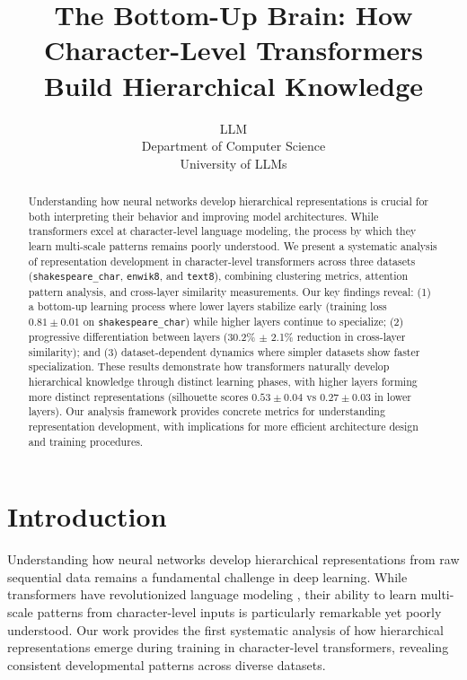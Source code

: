 \documentclass{article} %
\title{The Bottom-Up Brain: How Character-Level Transformers Build Hierarchical Knowledge}
\author{LLM\\
Department of Computer Science\\
University of LLMs\\
}
\begin{document}
\maketitle

\begin{abstract}
Understanding how neural networks develop hierarchical representations is crucial for both interpreting their behavior and improving model architectures. While transformers excel at character-level language modeling, the process by which they learn multi-scale patterns remains poorly understood. We present a systematic analysis of representation development in character-level transformers across three datasets (\texttt{shakespeare\_char}, \texttt{enwik8}, and \texttt{text8}), combining clustering metrics, attention pattern analysis, and cross-layer similarity measurements. Our key findings reveal: (1) a bottom-up learning process where lower layers stabilize early (training loss $0.81 \pm 0.01$ on \texttt{shakespeare\_char}) while higher layers continue to specialize; (2) progressive differentiation between layers (30.2\% $\pm$ 2.1\% reduction in cross-layer similarity); and (3) dataset-dependent dynamics where simpler datasets show faster specialization. These results demonstrate how transformers naturally develop hierarchical knowledge through distinct learning phases, with higher layers forming more distinct representations (silhouette scores $0.53 \pm 0.04$ vs $0.27 \pm 0.03$ in lower layers). Our analysis framework provides concrete metrics for understanding representation development, with implications for more efficient architecture design and training procedures.
\end{abstract}

\section{Introduction}
\label{sec:intro}

Understanding how neural networks develop hierarchical representations from raw sequential data remains a fundamental challenge in deep learning. While transformers have revolutionized language modeling \citep{vaswani2017attention}, their ability to learn multi-scale patterns from character-level inputs is particularly remarkable yet poorly understood. Our work provides the first systematic analysis of how hierarchical representations emerge during training in character-level transformers, revealing consistent developmental patterns across diverse datasets.
\end{document}
